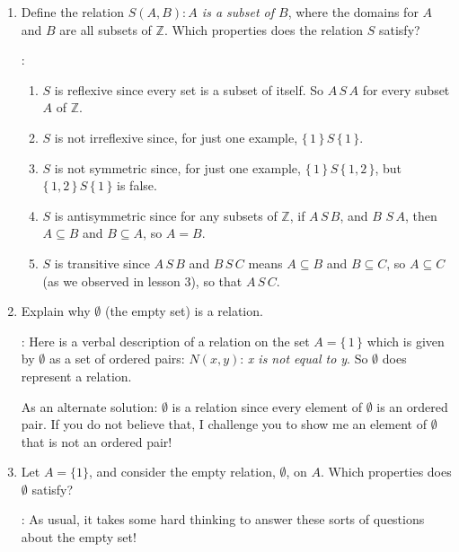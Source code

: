 \documentclass[11pt]{amsart}
\begin{document}
\begin{enumerate}
\item Define the relation {\it $S(A,B) : A $ is a subset of $B$}, where the
domains for $A$ and $B$ are all subsets of $\mathbb{Z}$. Which properties does the relation $S$ satisfy?

: 
\vskip 5pt

\begin{enumerate}

\item $S$ is reflexive since every set is a subset of itself. So $A\,S\,A$ for
every subset $A$ of $\mathbb{Z}$.

\item $S$ is not irreflexive since, for just one example, $\{\,1\,\}\,S\,\{\,1\,\}$.

\item $S$ is not symmetric since, for just one example, $\{\,1\,\}\,S\,\{\,1,2\,\}$,
but $\{\,1,2\,\}\,S\,\{\,1\,\}$ is false.

\item $S$ is antisymmetric since for any subsets of $\mathbb{Z}$, if $A\,S\,B$, and $B\,\,S\,A$,
then $A\subseteq B$ and $B\subseteq A$, so $A=B$.

\item $S$ is transitive since $A\,S\,B$ and $B\,S\,C$ means $A\subseteq B$ and $B\subseteq C$,
so $A\subseteq C$ (as we observed in lesson 3),  so that $A\,S\,C$.

\end{enumerate}

\item  Explain why $\emptyset$ (the empty set) is a relation.

: Here is a verbal description of a relation on the set $A=\{\,1\,\}$
which is given by  $\emptyset$ as a set of ordered pairs: $N(x,y)$: {\it x is not equal to y}.
So $\emptyset$ does represent a relation.

As an alternate solution: $\emptyset$ is a relation since every element of $\emptyset$ is an ordered pair.
If you do not believe that, I challenge you to show me an element of $\emptyset$ that
is not an ordered pair!

\item Let $A=\{1\}$, and consider the empty relation, $\emptyset$,  on $A$. 
Which properties does 
 $\emptyset$ satisfy?

:  As usual, it takes some hard thinking to answer these
sorts of questions about the empty set!


\end{enumerate}
\end{document}
